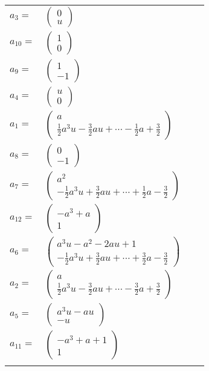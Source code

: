 \documentclass[1p]{elsarticle_modified}
\theoremstyle{definition}
\begin{document}
\begin{tabular}{m{7pt} m{180pt} m{7pt} m{180pt} }
\flushright $a_{3}=$&$\begin{pmatrix}0\\u\end{pmatrix}$ \\
\flushright $a_{10}=$&$\begin{pmatrix}1\\0\end{pmatrix}$ \\
\flushright $a_{9}=$&$\begin{pmatrix}1\\-1\end{pmatrix}$ \\
\flushright $a_{4}=$&$\begin{pmatrix}u\\0\end{pmatrix}$ \\
\flushright $a_{1}=$&$\begin{pmatrix}a\\\frac{1}{2} a^3 u-\frac{3}{2} a u+\cdots-\frac{1}{2} a+\frac{3}{2}\end{pmatrix}$ \\
\flushright $a_{8}=$&$\begin{pmatrix}0\\-1\end{pmatrix}$ \\
\flushright $a_{7}=$&$\begin{pmatrix}a^2\\-\frac{1}{2} a^3 u+\frac{3}{2} a u+\cdots+\frac{1}{2} a-\frac{3}{2}\end{pmatrix}$ \\
\flushright $a_{12}=$&$\begin{pmatrix}- a^3+a\\1\end{pmatrix}$ \\
\flushright $a_{6}=$&$\begin{pmatrix}a^3 u- a^2-2 a u+1\\-\frac{1}{2} a^3 u+\frac{3}{2} a u+\cdots+\frac{3}{2} a-\frac{3}{2}\end{pmatrix}$ \\
\flushright $a_{2}=$&$\begin{pmatrix}a\\\frac{1}{2} a^3 u-\frac{3}{2} a u+\cdots-\frac{3}{2} a+\frac{3}{2}\end{pmatrix}$ \\
\flushright $a_{5}=$&$\begin{pmatrix}a^3 u- a u\\- u\end{pmatrix}$ \\
\flushright $a_{11}=$&$\begin{pmatrix}- a^3+a+1\\1\end{pmatrix}$\\&\end{tabular}
\end{document}
